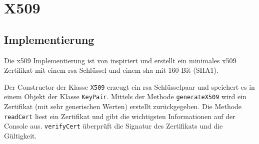 \chapter{X509}

\section{Implementierung}
Die x509 Implementierung ist von \cite{bouncy01} inspiriert und erstellt ein minimales x509 Zertifikat mit einem \gls{rsa} Schlüssel und einem \gls{sha} mit 160 Bit (SHA1).

Der Constructor der Klasse \texttt{X509} erzeugt ein \gls{rsa} Schlüsselpaar und speichert es in einem Objekt der Klasse \texttt{KeyPair}.
Mittels der Methode \texttt{generateX509} wird ein Zertifikat (mit sehr generischen Werten) erstellt zurückgegeben.
Die Methode \texttt{readCert} liest ein Zertifikat und gibt die wichtigsten Informationen auf der Console aus.
\texttt{verifyCert} überprüft die Signatur des Zertifikats und die Gültigkeit.
